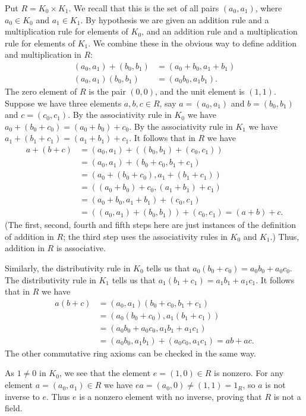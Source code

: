 \documentclass{amsart}
\newcommand{\tm}        {\times}
\renewcommand{\:}{\colon}
\newenvironment{solution}{\SolutionInline}{\endSolutionInline}
\theoremstyle{definition}
\renewenvironment{solution}{\SolutionAtEnd}{\endSolutionAtEnd}
\begin{document}
\begin{solution}
 Put $R=K_0\tm K_1$.  We recall that this is the set of all pairs
 $(a_0,a_1)$, where $a_0\in K_0$ and $a_1\in K_1$.  By hypothesis we
 are given an addition rule and a multiplication rule for elements of
 $K_0$, and an addition rule and a multiplication rule for elements of
 $K_1$.  We combine these in the obvious way to define addition and
 multiplication in $R$:
 \begin{align*}
  (a_0,a_1) + (b_0,b_1) &= (a_0+b_0,a_1+b_1) \\
  (a_0,a_1)(b_0,b_1) &= (a_0b_0,a_1b_1).
 \end{align*}
 The zero element of $R$ is the pair $(0,0)$, and the unit element is
 $(1,1)$.  Suppose we have three elements $a,b,c\in R$, say
 $a=(a_0,a_1)$ and $b=(b_0,b_1)$ and $c=(c_0,c_1)$.  By the
 associativity rule in $K_0$ we have $a_0+(b_0+c_0)=(a_0+b_0)+c_0$.
 By the associativity rule in $K_1$ we have
 $a_1+(b_1+c_1)=(a_1+b_1)+c_1$.  It follows that in $R$ we have
 \begin{align*}
  a+(b+c) &= (a_0,a_1) + ((b_0,b_1)+(c_0,c_1)) \\
   &= (a_0,a_1)+(b_0+c_0,b_1+c_1) \\
   &= (a_0+(b_0+c_0),a_1+(b_1+c_1)) \\
   &= ((a_0+b_0)+c_0,(a_1+b_1)+c_1) \\
   &= (a_0+b_0,a_1+b_1)+(c_0,c_1) \\
   &= ((a_0,a_1)+(b_0,b_1))+(c_0,c_1) = (a+b)+c.
 \end{align*}
 (The first, second, fourth and fifth steps here are just instances of
 the definition of addition in $R$; the third step uses the
 associativity rules in $K_0$ and $K_1$.)  Thus, addition in $R$ is
 associative. 

 Similarly, the distributivity rule in $K_0$ tells us that
 $a_0(b_0+c_0)=a_0b_0+a_0c_0$.  The distributivity rule in $K_1$ tells
 us that $a_1(b_1+c_1)=a_1b_1+a_1c_1$.  It follows that in $R$ we have 
 \begin{align*}
  a(b+c) &= (a_0,a_1)(b_0+c_0,b_1+c_1) \\
         &= (a_0(b_0+c_0),a_1(b_1+c_1)) \\
         &= (a_0b_0+a_0c_0,a_1b_1+a_1c_1) \\
         &= (a_0b_0,a_1b_1)+(a_0c_0,a_1c_1) = ab+ac.
 \end{align*}
 The other commutative ring axioms can be checked in the same way.

 As $1\neq 0$ in $K_0$, we see that the element $e=(1,0)\in R$ is
 nonzero.  For any element $a=(a_0,a_1)\in R$ we have
 $ea=(a_0,0)\neq(1,1)=1_R$, so $a$ is not inverse to $e$.  Thus $e$ is
 a nonzero element with no inverse, proving that $R$ is not a field.
\end{solution}
\end{document}
